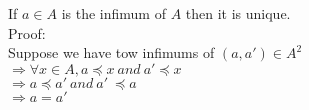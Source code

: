 \documentclass{article}
\begin{document}
\noindent If $a \in A$ is the infimum of $A$ then it is unique.\\

\noindent Proof:\\
Suppose we have tow infimums of $(a, a') \in A^2$\\
$\Rightarrow \forall x \in A, a \preceq x \ and \
a' \preceq x$\\
$\Rightarrow a \preceq a' \ and \ a' \ \preceq a$\\
$\Rightarrow a = a'$
\end{document}

